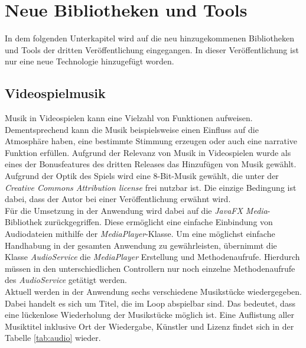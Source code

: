 \section{Neue Bibliotheken und Tools}
In dem folgenden Unterkapitel wird auf die neu hinzugekommenen Bibliotheken und Tools der dritten Veröffentlichung eingegangen. In dieser Veröffentlichung ist nur eine neue Technologie hinzugefügt worden.

\subsection{Videospielmusik}
Musik in Videospielen kann eine Vielzahl von Funktionen aufweisen. Dementsprechend kann die Musik beispielsweise einen Einfluss auf die Atmosphäre haben, eine bestimmte Stimmung erzeugen oder auch eine narrative Funktion erfüllen.\cite{Stingel} Aufgrund der Relevanz von Musik in Videospielen wurde als eines der Bonusfeatures des dritten Releases das Hinzufügen von Musik gewählt. Aufgrund der Optik des Spiels wird eine \Gls{8-Bit-Musik} gewählt, die unter der \textit{Creative Commons Attribution license} frei nutzbar ist. Die einzige Bedingung ist dabei, dass der Autor bei einer Veröffentlichung erwähnt wird. \\

Für die Umsetzung in der Anwendung wird dabei auf die \textit{JavaFX Media}-Bibliothek zurückgegriffen. Diese ermöglicht eine einfache Einbindung von Audiodateien mithilfe der \textit{MediaPlayer}-Klasse. Um eine möglichst einfache Handhabung in der gesamten Anwendung zu gewährleisten, übernimmt die Klasse \textit{AudioService} die \textit{MediaPlayer} Erstellung und Methodenaufrufe. Hierdurch müssen in den unterschiedlichen Controllern nur noch einzelne Methodenaufrufe des \textit{AudioService} getätigt werden. \\

Aktuell werden in der Anwendung sechs verschiedene Musikstücke wiedergegeben. Dabei handelt es sich um Titel, die im Loop abspielbar sind. Das bedeutet, dass eine lückenlose Wiederholung der Musikstücke möglich ist. Eine Auflistung aller Musiktitel inklusive Ort der Wiedergabe, Künstler und Lizenz findet sich in der Tabelle \ref{tab:audio} wieder.